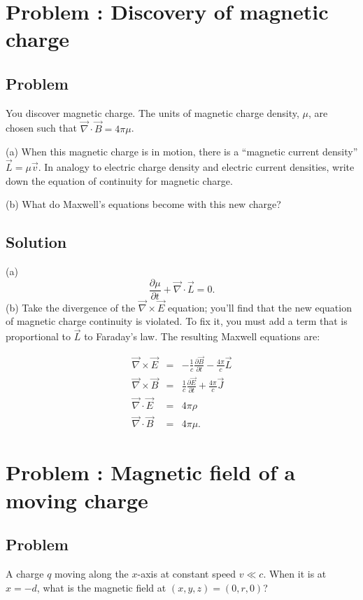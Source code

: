 \documentclass[solutions]{esg8022pset}
\date{\today }
\begin{document}
\section{Problem \thesection: Discovery of magnetic charge}
\subsection{Problem}
You discover magnetic
charge.  The units of magnetic charge density,
$\mu$, are chosen such that $\vec\nabla\cdot\vec B = 4\pi\mu$.

\par\noindent (a) When this magnetic charge is in motion,
there is a ``magnetic current density'' $\vec L = \mu \vec v$.  In
analogy to electric charge density and electric current densities,
write down the equation of continuity for magnetic charge.

\par\noindent (b) What do Maxwell's equations become with this
new charge?
\subsection{Solution}
(a) \begin{equation}
\frac{\partial \mu}{\partial t}+\vec{\nabla}\cdot\vec{L}=0.
\end{equation}
(b) Take the divergence of the $\vec\nabla\times\vec E$ equation; you'll
find that the new equation of magnetic charge continuity is violated.
To fix it, you must add a term that is proportional to $\vec L$ to
Faraday's law.  The resulting Maxwell equations are:

\begin{eqnarray}
\vec{\nabla}\times\vec{E} &=& -\frac{1}{c}\frac{\partial
\vec{B}}{\partial t}-\frac{4\pi}{c}\vec{L}\\
\vec{\nabla}\times\vec{B} &=& \frac{1}{c}\frac{\partial
\vec{E}}{\partial t}+\frac{4\pi}{c}\vec{J}\\
\vec{\nabla}\cdot\vec{E} &=& 4\pi\rho\\
\vec{\nabla}\cdot\vec{B} &=& 4\pi\mu.
\end{eqnarray}




\section{Problem \thesection:  Magnetic field of a moving charge}
\subsection{Problem}
A charge $q$ moving
along the $x$-axis at constant speed $v \ll c$.  When it is at $x =
-d$, what is the magnetic field at $(x,y,z) = (0,r,0)$?
\end{document}

